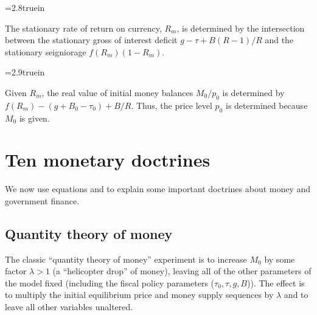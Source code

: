 




\centerline{\epsfxsize=2.8truein}
\caption{The stationary rate of return on currency, $R_m$, is determined by
the intersection between the stationary gross of
interest deficit $g- \tau+B(R-1)/R$ and the stationary seigniorage
$f(R_m)(1-R_m)$.}
%
\endfigure




\centerline{\epsfxsize=2.9truein}
\caption{Given $R_m$, the real value
of initial money balances $M_0/p_0$ is determined by
$f(R_m) - (g +B_0 -\tau_0) + B / R$. Thus, the price
level $p_0$ is determined because $M_0$ is given.}
\endfigure


\section{Ten monetary doctrines}\label{sec:10Mdoctrines}%
We now use equations  and  to explain
some important doctrines about money and government finance.
%
\subsection{Quantity theory of money}
  The classic ``quantity theory of money'' experiment is to increase
$M_0$ by some factor $\lambda >1$ (a ``helicopter drop'' of money),
leaving all of the other parameters of the model fixed (including the
fiscal policy parameters ($\tau_0, \tau,g, B$)).  The effect is to
multiply the initial equilibrium price and money supply sequences
by $\lambda$ and to leave all other variables unaltered.
